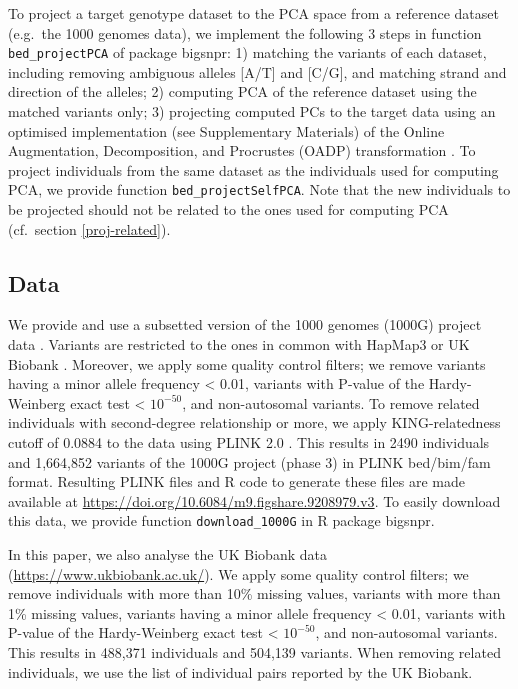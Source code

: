 \documentclass{bioinfo}
\begin{document}
\begin{methods}
To project a target genotype dataset to the PCA space from a reference dataset (e.g.\ the 1000 genomes data), we implement the following 3 steps in function \texttt{bed\_projectPCA} of package bigsnpr: 1) matching the variants of each dataset, including removing ambiguous alleles [A/T] and [C/G], and matching strand and direction of the alleles; 2) computing PCA of the reference dataset using the matched variants only; 3) projecting computed PCs to the target data using an optimised implementation (see Supplementary Materials) of the Online Augmentation, Decomposition, and Procrustes (OADP) transformation \cite[]{zhang2019fast}.
To project individuals from the same dataset as the individuals used for computing PCA, we provide function \texttt{bed\_projectSelfPCA}. 
Note that the new individuals to be projected should not be related to the ones used for computing PCA (cf.\ section \ref{proj-related}).

\subsection{Data\label{1000G}}

We provide and use a subsetted version of the 1000 genomes (1000G) project data \cite[]{10002015global,meyer2019genotype}.
Variants are restricted to the ones in common with HapMap3 or UK Biobank \cite[]{international2010integrating,bycroft2017genome}. 
Moreover, we apply some quality control filters; we remove variants having a minor allele frequency < 0.01, variants with P-value of the Hardy-Weinberg exact test < $10^{-50}$, and non-autosomal variants. 
To remove related individuals with second-degree relationship or more, we apply KING-relatedness cutoff of 0.0884 to the data using PLINK 2.0 \cite[]{manichaikul2010robust,chang2015second}.
This results in 2490 individuals and 1,664,852 variants of the 1000G project (phase 3) in PLINK bed/bim/fam format. 
Resulting PLINK files and R code to generate these files are made available at \url{https://doi.org/10.6084/m9.figshare.9208979.v3}. 
To easily download this data, we provide function \texttt{download\_1000G} in R package bigsnpr.

In this paper, we also analyse the UK Biobank data (\url{https://www.ukbiobank.ac.uk/}).
We apply some quality control filters; we remove individuals with more than 10\% missing values, variants with more than 1\% missing values, variants having a minor allele frequency < 0.01, variants with P-value of the Hardy-Weinberg exact test < $10^{-50}$, and non-autosomal variants. 
This results in 488,371 individuals and 504,139 variants.
When removing related individuals, we use the list of individual pairs reported by the UK Biobank.


\end{methods}
\end{document}
